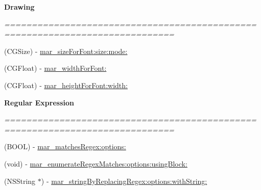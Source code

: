 \begin{Indent}\textbf{ Drawing}\par
{\em ============================================================================= 

 }\begin{DoxyCompactItemize}
\item 
(C\+G\+Size) -\/ \hyperlink{category_n_s_string_07_m_a_r_e_x_08_a7b2c43f95eb3caa2bf1f1ebd9ac0e6af}{mar\+\_\+size\+For\+Font\+:size\+:mode\+:}
\item 
(C\+G\+Float) -\/ \hyperlink{category_n_s_string_07_m_a_r_e_x_08_a5cee15474217cc982a9412c78e0006b4}{mar\+\_\+width\+For\+Font\+:}
\item 
(C\+G\+Float) -\/ \hyperlink{category_n_s_string_07_m_a_r_e_x_08_a00607982510e24191e99101500b84f58}{mar\+\_\+height\+For\+Font\+:width\+:}
\end{DoxyCompactItemize}
\end{Indent}
\begin{Indent}\textbf{ Regular Expression}\par
{\em ============================================================================= 

 }\begin{DoxyCompactItemize}
\item 
(B\+O\+OL) -\/ \hyperlink{category_n_s_string_07_m_a_r_e_x_08_a212e448cbc097a7670dc710af003ca7e}{mar\+\_\+matches\+Regex\+:options\+:}
\item 
(void) -\/ \hyperlink{category_n_s_string_07_m_a_r_e_x_08_a5cdc6996746ed2f11c267fcaf39bd49f}{mar\+\_\+enumerate\+Regex\+Matches\+:options\+:using\+Block\+:}
\item 
(N\+S\+String $\ast$) -\/ \hyperlink{category_n_s_string_07_m_a_r_e_x_08_aba685f4086abefbe3b09625f6beccfad}{mar\+\_\+string\+By\+Replacing\+Regex\+:options\+:with\+String\+:}
\end{DoxyCompactItemize}
\end{Indent}

